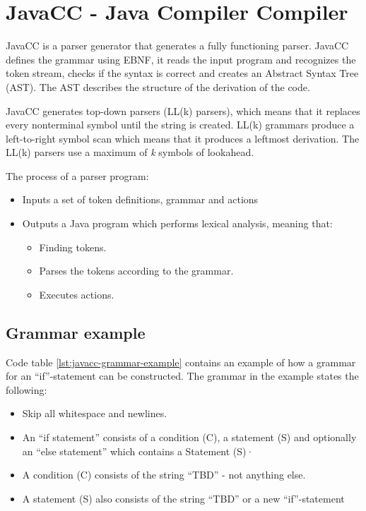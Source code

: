 \chapter{JavaCC - Java Compiler Compiler}
JavaCC is a parser generator that generates a fully functioning parser. JavaCC defines the grammar using EBNF, it reads the input program and recognizes the token stream, checks if the syntax is correct and creates an Abstract Syntax Tree (AST). The AST describes the structure of the derivation of the code. \cite{JavaCC}

JavaCC generates top-down parsers (LL(k) parsers), which means that it replaces every nonterminal symbol until the string is created. LL(k) grammars produce a left-to-right symbol scan which means that it produces a leftmost derivation. The LL(k) parsers use a maximum of \textit{k} symbols of lookahead.

The process of a parser program:
\begin{itemize}
\item Inputs a set of token definitions, grammar and actions
\item Outputs a Java program which performs lexical analysis, meaning that:
	\begin{itemize}
	\item Finding tokens.
	\item Parses the tokens according to the grammar.
	\item Executes actions.
	\end{itemize}
\end{itemize}


\section{Grammar example}
Code table \ref{lst:javacc-grammar-example} contains an example of how a grammar for an ``if''-statement can be constructed. The grammar in the example states the following:

\begin{itemize}
	\item Skip all whitespace and newlines.
	\item An ``if statement'' consists of a condition (C), a statement (S)  and optionally an ``else statement'' which contains a Statement (S)·
	\item A condition (C) consists of the string ``TBD'' - not anything else.
	\item A statement (S) also consists of the string ``TBD'' or a new ``if''-statement
\end{itemize}

